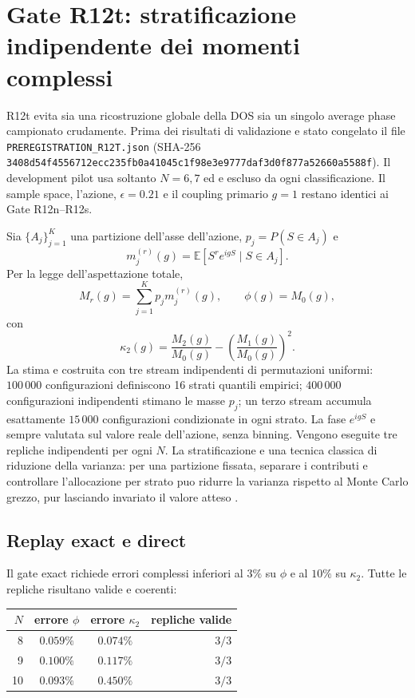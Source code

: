 \documentclass[11pt,a4paper]{article}
\begin{document}
\section{Gate R12t: stratificazione indipendente dei momenti complessi}

R12t evita sia una ricostruzione globale della DOS sia un singolo average phase campionato crudamente. Prima dei risultati di validazione e stato congelato il file \texttt{PREREGISTRATION\_R12T.json} (SHA-256 \texttt{3408d54f4556712ecc235fb0a41045c1f98e3e9777daf3d0f877a52660a5588f}). Il development pilot usa soltanto $N=6,7$ ed e escluso da ogni classificazione. Il sample space, l'azione, $\epsilon=0.21$ e il coupling primario $g=1$ restano identici ai Gate R12n--R12s.

Sia $\{A_j\}_{j=1}^{K}$ una partizione dell'asse dell'azione, $p_j=P(S\in A_j)$ e
\begin{equation}
 m_j^{(r)}(g)=\mathbb E\!\left[S^r e^{igS}\mid S\in A_j\right].
\end{equation}
Per la legge dell'aspettazione totale,
\begin{equation}
 M_r(g)=\sum_{j=1}^{K}p_jm_j^{(r)}(g),\qquad
 \phi(g)=M_0(g),
\end{equation}
con
\begin{equation}
 \kappa_2(g)=\frac{M_2(g)}{M_0(g)}-
 \left(\frac{M_1(g)}{M_0(g)}\right)^2.
 \label{eq:r12tstratified}
\end{equation}
La stima e costruita con tre stream indipendenti di permutazioni uniformi: $100\,000$ configurazioni definiscono 16 strati quantili empirici; $400\,000$ configurazioni indipendenti stimano le masse $p_j$; un terzo stream accumula esattamente $15\,000$ configurazioni condizionate in ogni strato. La fase $e^{igS}$ e sempre valutata sul valore reale dell'azione, senza binning. Vengono eseguite tre repliche indipendenti per ogni $N$. La stratificazione e una tecnica classica di riduzione della varianza: per una partizione fissata, separare i contributi e controllare l'allocazione per strato puo ridurre la varianza rispetto al Monte Carlo grezzo, pur lasciando invariato il valore atteso \cite{Sayah2019}.

\subsection{Replay exact e direct}

Il gate exact richiede errori complessi inferiori al $3\%$ su $\phi$ e al $10\%$ su $\kappa_2$. Tutte le repliche risultano valide e coerenti:
\begin{center}
\begin{tabular}{rccr}
\toprule
$N$ & errore $\phi$ & errore $\kappa_2$ & repliche valide \\
\midrule
8  & $0.059\%$ & $0.074\%$ & $3/3$ \\
9  & $0.100\%$ & $0.117\%$ & $3/3$ \\
10 & $0.093\%$ & $0.450\%$ & $3/3$ \\
\bottomrule
\end{tabular}
\end{center}
\end{document}
